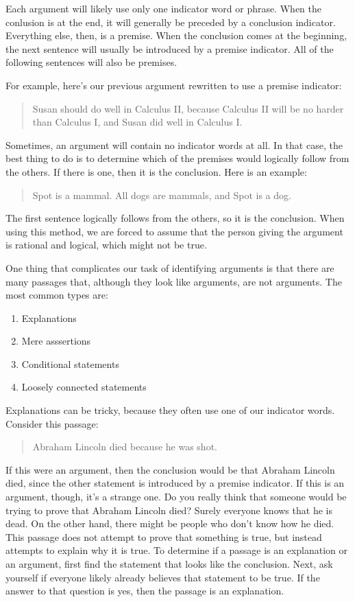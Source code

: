\documentclass[../logic-text.tex]{subfiles}
\begin{document}
Each argument will likely use only one indicator word or phrase. When the conlusion is at the end, it will generally be preceded by a conclusion indicator. Everything else, then, is a premise. When the conclusion comes at the beginning, the next sentence will usually be introduced by a premise indicator. All of the following sentences will also be premises.

For example, here's our previous argument rewritten to use a premise indicator:

\begin{quote}
Susan should do well in Calculus II, because Calculus II will be no harder than Calculus I, and Susan did well in Calculus I.
\end{quote}

Sometimes, an argument will contain no indicator words at all. In that case, the best thing to do is to determine which of the premises would logically follow from the others. If there is one, then it is the conclusion. Here is an example:

\begin{quote}
Spot is a mammal. All dogs are mammals, and Spot is a dog.
\end{quote}

The first sentence logically follows from the others, so it is the conclusion. When using this method, we are forced to assume that the person giving the argument is rational and logical, which might not be true.

One thing that complicates our task of identifying arguments is that there are many passages that, although they look like arguments, are not arguments. The most common types are:

\begin{enumerate}
\item Explanations
\item Mere asssertions
\item Conditional statements
\item Loosely connected statements
\end{enumerate}

Explanations can be tricky, because they often use one of our indicator words. Consider this passage:

\begin{quote}
Abraham Lincoln died because he was shot.
\end{quote}

If this were an argument, then the conclusion would be that Abraham Lincoln died, since the other statement is introduced by a premise indicator. If this is an argument, though, it's a strange one. Do you really think that someone would be trying to prove that Abraham Lincoln died? Surely everyone knows that he is dead. On the other hand, there might be people who don't know how he died. This passage does not attempt to prove that something is true, but instead attempts to explain why it is true. To determine if a passage is an explanation or an argument, first find the statement that looks like the conclusion. Next, ask yourself if everyone likely already believes that statement to be true. If the answer to that question is yes, then the passage is an explanation.
\end{document}
